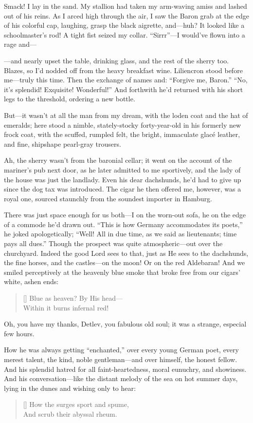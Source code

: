 \documentclass[12pt,a4paper]{article}
\begin{document}
Smack! I lay in the sand. My stallion had taken my arm-waving amiss and lashed out of his reins. As I arced high through the air, I saw the Baron grab at the edge of his colorful cap, laughing, grasp the black aigrette, and—huh? It looked like a schoolmaster’s rod! A tight fist seized my collar. “Sirrr”—I would’ve flown into a rage and—

—and nearly upset the table, drinking glass, and the rest of the sherry too. Blazes, so I’d nodded off from the heavy breakfast wine. Liliencron stood before me—truly this time. Then the exchange of names and: “Forgive me, Baron.” “No, it’s splendid! Exquisite! Wonderful!” And forthwith he’d returned with his short legs to the threshold, ordering a new bottle.

But—it wasn’t at all the man from my dream, with the loden coat and the hat of emeralds; here stood a nimble, stately-stocky forty-year-old in his formerly new frock coat, with the scuffed, rumpled felt, the bright, immaculate glacé leather, and fine, shipshape pearl-gray trousers.

Ah, the sherry wasn’t from the baronial cellar; it went on the account of the mariner’s pub next door, as he later admitted to me sportively, and the lady of the house was just the landlady. Even his dear dachshunds, he’d had to give up since the dog tax was introduced. The cigar he then offered me, however, was a royal one, sourced staunchly from the soundest importer in Hamburg.

There was just space enough for us both—I on the worn-out sofa, he on the edge of a commode he’d drawn out. “This is how Germany accommodates its poets,” he joked apologetically; “Well! All in due time, as we said as lieutenants; time pays all dues.” Though the prospect was quite atmospheric—out over the churchyard. Indeed the good Lord sees to that, just as He sees to the dachshunds, the fine horses, and the castles—on the moon! Or on the red Aldebaran! And we smiled perceptively at the heavenly blue smoke that broke free from our cigars’ white, ashen ends:
\settowidth{\versewidth}{Blue as heaven? By His head—}
\begin{verse}[\versewidth]
Blue as heaven? By His head— \\
Within it burns infernal red!
\end{verse}

Oh, you have my thanks, Detlev, you fabulous old soul; it was a strange, especial few hours.

How he was always getting “enchanted,” over every young German poet, every merest talent, the kind, noble gentleman—and over himself, the honest fellow. And his splendid hatred for all faint-heartedness, moral eunuchry, and showiness. And his conversation—like the distant melody of the sea on hot summer days, lying in the dunes and wishing only to hear:
\settowidth{\versewidth}{How the surges sport and spume,}
\begin{verse}[\versewidth]
How the surges sport and spume, \\
And scrub their abyssal rheum.
\end{verse}
\end{document}
